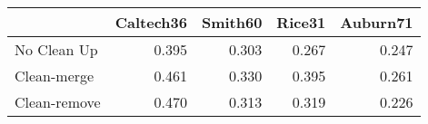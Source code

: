 \begin{tabular}{lrrrr}
\toprule
{} & Caltech36 & Smith60 & Rice31 & Auburn71 \\
\midrule
No Clean Up  &     0.395 &   0.303 &  0.267 &    0.247 \\
Clean-merge  &     0.461 &   0.330 &  0.395 &    0.261 \\
Clean-remove &     0.470 &   0.313 &  0.319 &    0.226 \\
\bottomrule
\end{tabular}
